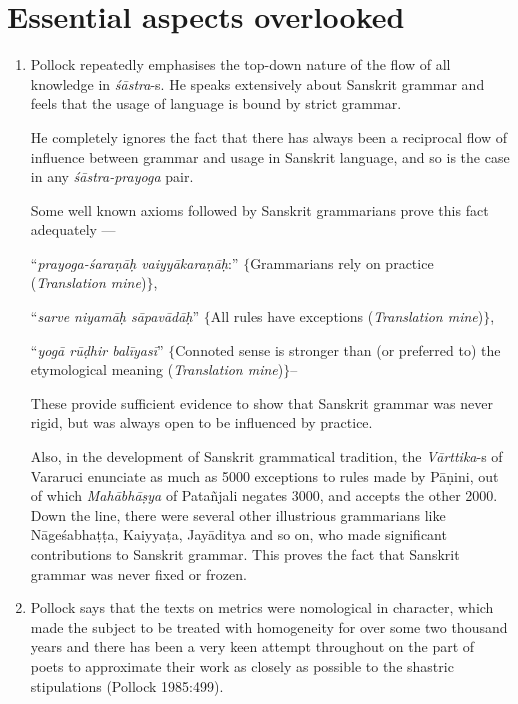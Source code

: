\section*{Essential aspects overlooked}

\begin{enumerate}
\item Pollock repeatedly emphasises the top-down nature of the flow of all knowledge in {\it śāstra}-s. He speaks extensively about Sanskrit grammar and feels that the usage of language is bound by strict grammar. 

He completely ignores the fact that there has always been a reciprocal flow of influence between grammar and usage in Sanskrit language, and so is the case in any \textsl{śāstra-prayoga} pair. 

Some well known axioms followed by Sanskrit grammarians prove this fact adequately --- 

``\textsl{prayoga-śaraṇāḥ vaiyyākaraṇāḥ}:'' $\{$Grammarians rely on practice (\textsl{Translation mine})$\}$, 

``\textsl{sarve niyamāḥ sāpavādāḥ}'' $\{$All rules have exceptions (\textsl{Translation mine})$\}$, 

``\textsl{yogā rūḍhir balīyasī}'' $\{$Connoted sense is stronger than (or preferred to) the etymological meaning (\textsl{Translation mine})$\}$-- 

These provide sufficient evidence to show that Sanskrit grammar was never rigid, but was always open to be influenced by practice. 

Also, in the development of Sanskrit grammatical tradition, the  {\it Vārttika}-s of Vararuci enunciate as much as 5000 exceptions to rules made by Pāṇini, out of which {\it Mahābhāṣya} of Patañjali negates 3000, and accepts the other 2000. Down the line, there were several other illustrious grammarians like Nāgeśabhaṭṭa, Kaiyyaṭa,  Jayāditya and so on, who made significant contributions to Sanskrit grammar. This proves the fact that Sanskrit grammar  was never fixed or frozen.

\item Pollock says that the texts on metrics were nomological in character, which made the subject to be treated with homogeneity for over some two thousand years and there has been a very keen attempt throughout on the part of poets to approximate their work as closely as possible to the shastric stipulations (Pollock 1985:499). 


\end{enumerate}
